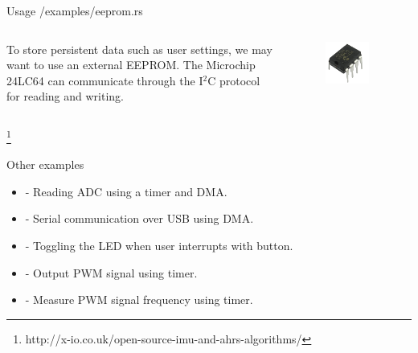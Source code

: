 \documentclass[
  aspectratio=169,
]{beamer}
\begin{document}
\begin{frame}{Usage /examples/eeprom.rs}
\begin{columns}[T] %
\hfill%
\begin{column}{.53\textwidth}
\vspace{10mm}
To store persistent data such as user settings, we may want to use an external EEPROM. The Microchip 24LC64 can communicate through the I$^2$C protocol for reading and writing.
\end{column}%
\hfill%
\begin{column}{.47\textwidth}
\vspace{-10mm}
\begin{figure}
\includegraphics[width=0.8\textwidth,height=0.8\textheight,keepaspectratio]{24lc64.jpg}
\end{figure}
\end{column}%
\end{columns}
\footnote{http://x-io.co.uk/open-source-imu-and-ahrs-algorithms/}
\end{frame}



\begin{frame}{Other examples}
\begin{itemize}
\item {} - Reading ADC using a timer and DMA.
\item {} - Serial communication over USB using DMA.
\item {} - Toggling the LED when user interrupts with button.
\item {} - Output PWM signal using timer.
\item {} - Measure PWM signal frequency using timer.
\end{itemize}
\end{frame}
\end{document}
